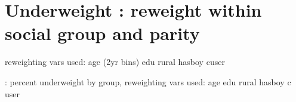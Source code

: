 \documentclass{article}
\begin{document}








\newpage 
\section{Underweight : reweight within \textbf{social group and parity} }

reweighting vars used: age (2yr bins) edu rural hasboy cuser

\begin{table}[H]
    \centering
    \footnotesize %
    \caption{: percent underweight by group, reweighting vars used: age edu rural hasboy c user}
    \label{tab:sumstat}
\end{table}

\end{document}
